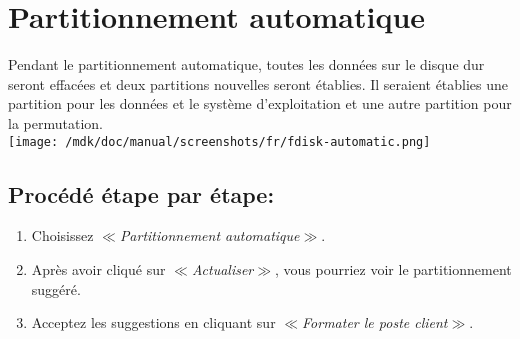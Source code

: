 \section{Partitionnement automatique}Pendant le partitionnement automatique, toutes les donn\'ees sur le disque dur seront effac\'ees et deux partitions nouvelles seront \'etablies. Il seraient \'etablies une partition pour les donn\'ees et le syst\`eme d'exploitation et une autre partition pour la permutation.\\
\texttt{[image: /mdk/doc/manual/screenshots/fr/fdisk-automatic.png]} \\
\subsection{Proc\'ed\'e \'etape par \'etape:}
\begin{enumerate}
\item Choisissez \textit{$\ll$Partitionnement automatique$\gg$}.\\
\item Apr\`es avoir cliqu\'e sur \textit{$\ll$Actualiser$\gg$}, vous pourriez voir le partitionnement sugg\'er\'e.\\
\item Acceptez les suggestions en cliquant sur \textit{$\ll$Formater le poste client$\gg$}.\\
\end{enumerate}
